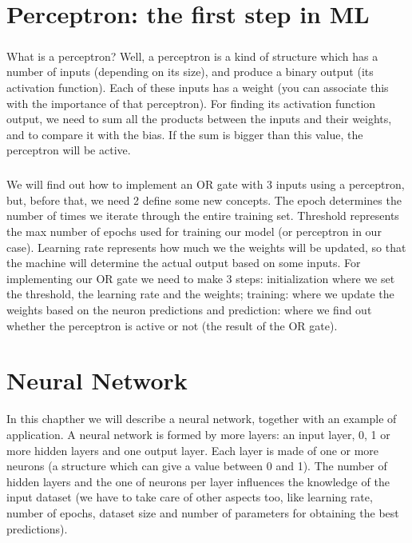 \documentclass[a4paper,12pt]{report}
\begin{document}
{\let\clearpage\relax \chapter{Perceptron: the first step in ML}}
\paragraph{} 
What is a perceptron? Well, a perceptron is a kind of structure which has a number of inputs (depending on its size), and produce a binary output (its activation function). Each of these inputs has a weight (you can associate this with the importance of that perceptron). For finding its activation function output, we need to sum all the products between the inputs and their weights, and to compare it with the bias. If the sum is bigger than this value, the perceptron will be active. 
\paragraph{}
We will find out how to implement an OR gate with 3 inputs using a perceptron, but, before that, we need 2 define some new concepts. The epoch determines the number of times we iterate through the entire training set. Threshold represents the max number of epochs used for training our model (or perceptron in our case). Learning rate represents how much we the weights will be updated, so that the machine will determine the actual output based on some inputs.
For implementing our OR gate we need to make 3 steps: initialization where we set the threshold, the learning rate and the weights; training: where we update the weights based on the neuron predictions and prediction: where we find out whether the perceptron is active or not (the result of the OR gate).


{\let\clearpage\relax \chapter{Neural Network}}
In this chapther we will describe a neural network, together with an example of application. 
A neural network is formed by more layers: an input layer, 0, 1 or more hidden layers and one output layer. Each layer is made of one or more neurons (a structure which can give a value between 0 and 1). The number of hidden layers and the one of neurons per layer influences the knowledge of the input dataset (we have to take care of other aspects too, like learning rate, number of epochs, dataset size and number of parameters for obtaining the best predictions).
\end{document}

